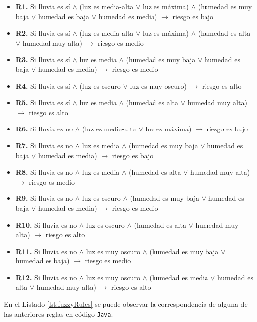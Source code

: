 \begin{itemize}
\item \textbf{R1.} Si lluvia es sí $\wedge$ (luz es media-alta $\vee$ luz es máxima) $\wedge$ (humedad es muy baja $\vee$ humedad es baja $\vee$ humedad es media) $\rightarrow$ riesgo es bajo
\item \textbf{R2.} Si lluvia es sí $\wedge$ (luz es media-alta $\vee$ luz es máxima) $\wedge$ (humedad es alta $\vee$ humedad muy alta) $\rightarrow$ riesgo es medio
\item \textbf{R3.} Si lluvia es sí $\wedge$ luz es media $\wedge$ (humedad es muy baja $\vee$ humedad es baja $\vee$ humedad es media) $\rightarrow$ riesgo es medio
\item \textbf{R4.} Si lluvia es sí $\wedge$ (luz es oscuro $\vee$ luz es muy oscuro) $\rightarrow$ riesgo es alto
\item \textbf{R5.} Si lluvia es sí $\wedge$ luz es media $\wedge$ (humedad es alta $\vee$ humedad muy alta) $\rightarrow$ riesgo es alto
\item \textbf{R6.} Si lluvia es no $\wedge$ (luz es media-alta $\vee$ luz es máxima) $\rightarrow$ riesgo es bajo
\item \textbf{R7.} Si lluvia es no $\wedge$ luz es media $\wedge$ (humedad es muy baja $\vee$ humedad es baja $\vee$ humedad es media) $\rightarrow$ riesgo es bajo
\item \textbf{R8.} Si lluvia es no $\wedge$ luz es media $\wedge$ (humedad es alta $\vee$ humedad muy alta) $\rightarrow$ riesgo es medio
\item \textbf{R9.} Si lluvia es no $\wedge$ luz es oscuro $\wedge$ (humedad es muy baja $\vee$ humedad es baja $\vee$ humedad es media) $\rightarrow$ riesgo es medio
\item \textbf{R10.} Si lluvia es no $\wedge$ luz es oscuro $\wedge$ (humedad es alta $\vee$ humedad muy alta) $\rightarrow$ riesgo es alto
\item \textbf{R11.} Si lluvia es no $\wedge$ luz es muy oscuro $\wedge$ (humedad es muy baja $\vee$ humedad es baja) $\rightarrow$ riesgo es medio
\item \textbf{R12.} Si lluvia es no $\wedge$ luz es muy oscuro $\wedge$ (humedad es media $\vee$ humedad es alta $\vee$ humedad muy alta) $\rightarrow$ riesgo es alto
\end{itemize}

En el Listado \ref{lst:fuzzyRules} se puede observar la correspondencia de alguna de las anteriores reglas en código \texttt{Java}.

